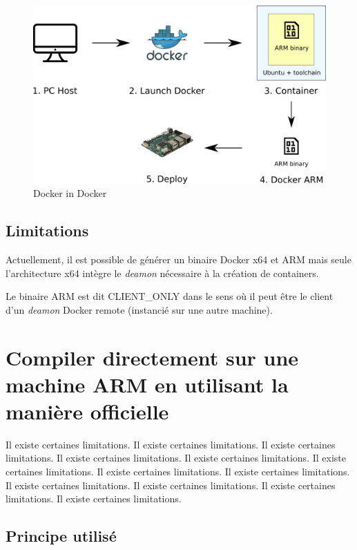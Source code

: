 \documentclass[11pt,a4paper,oneside]{report}
\begin{document}
\begin{figure}
    \begin{center}
        \includegraphics[scale=0.6]{img/docker_in_docker}
    \end{center}
    \caption{Docker in Docker}
    \label{fig_docker_in_docker}
\end{figure}

\subsection{Limitations}\label{maniere_officielle_limitations}

Actuellement, il est possible de générer un binaire Docker x64 et ARM mais seule l'architecture x64 intègre le \emph{deamon} nécessaire à la création de containers.

Le binaire ARM est dit CLIENT\_ONLY dans le sens où il peut être le client d'un \emph{deamon} Docker remote (instancié sur une autre machine).



\section{Compiler directement sur une machine ARM en utilisant la manière officielle}

Il existe certaines limitations.
Il existe certaines limitations.
Il existe certaines limitations.
Il existe certaines limitations.
Il existe certaines limitations.
Il existe certaines limitations.
Il existe certaines limitations.
Il existe certaines limitations.
Il existe certaines limitations.
Il existe certaines limitations.
Il existe certaines limitations.
Il existe certaines limitations.
\subsection{Principe utilisé}
\end{document}
